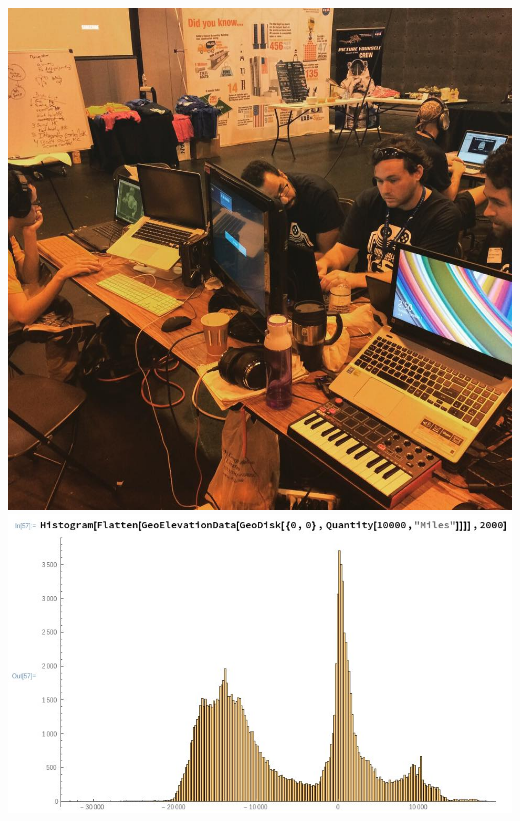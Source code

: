 \documentclass[../resume.tex]{subfiles}
\begin{document}
\noindent
\href{https://twitter.com/randompast/status/915414816638021633}{\includegraphics[scale=0.15]{../fun/indie_galactic_2.jpg}}
\href{https://twitter.com/randompast/status/794967546340356096}{\includegraphics[scale=0.28]{../scientific/WL_sea_level.jpeg}}


\newpage
\end{document}
